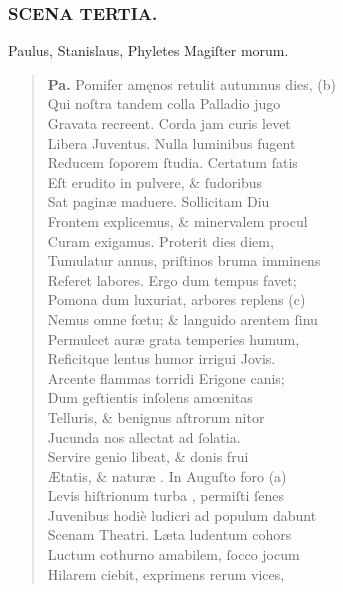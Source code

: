 \documentclass[a4paper,12pt]{article}
\begin{document}
\subsubsection{SCENA TERTIA.}
\label{sec:orgdce3349}

Paulus, Stanislaus, Phyletes Magiſter morum.
\begin{verse}
\textbf{Pa.} Pomifer amęnos retulit autumnus dies, (b)\footnotemark\\[0pt]
Qui noſtra tandem colla Palladio jugo\\[0pt]
Gravata recreent. Corda jam curis levet\\[0pt]
Libera Juventus. Nulla luminibus fugent\\[0pt]
Reducem ſoporem ſtudia. Certatum ſatis\\[0pt]
Eſt erudito in pulvere, \& ſudoribus\\[0pt]
Sat paginæ maduere. Sollicitam Diu\\[0pt]
Frontem explicemus, \& minervalem procul\\[0pt]
Curam exigamus. Proterit dies diem,\\[0pt]
Tumulatur annus, priſtinos bruma imminens\\[0pt]
Referet labores. Ergo dum tempus favet;\\[0pt]
Pomona dum luxuriat, arbores replens (c)\footnotemark\\[0pt]
Nemus omne fœtu; \& languido arentem ſinu\\[0pt]
Permulcet auræ grata temperies humum,\\[0pt]
Reficitque lentus humor irrigui Jovis.\\[0pt]
Arcente flammas torridi Erigone canis;\\[0pt]
Dum geſtientis inſolens amœnitas\\[0pt]
Telluris, \& benignus aſtrorum nitor\\[0pt]
Jucunda nos allectat ad ſolatia.\\[0pt]
Servire genio libeat, \& donis frui\\[0pt]
Ætatis, \& naturæ . In Auguſto foro (a)\footnotemark\\[0pt]
Levis hiſtrionum turba , permiſti ſenes\\[0pt]
Juvenibus hodiè ludicri ad populum dabunt\\[0pt]
Scenam Theatri. Læta ludentum cohors\\[0pt]
Luctum cothurno amabilem, ſocco jocum\\[0pt]
Hilarem ciebit, exprimens rerum vices,\\[0pt]

\end{verse}
\end{document}
